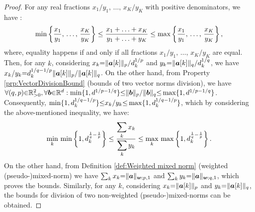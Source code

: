 \begin{proof}
For any real fractions $x_1/y_1,\,\ldots,\,x_K/y_K$ with positive denominators, we have \cite{pahio2005}:
\begin{gather*}
\min\left\lbrace \frac{x_1}{y_1},\,\ldots,\,\frac{x_K}{y_K} \right\rbrace \leq \frac{x_1+\ldots+x_K}{y_1+\ldots+y_K} \leq \max\left\lbrace \frac{x_1}{y_1},\,\ldots,\,\frac{x_K}{y_K} \right\rbrace,
\end{gather*}
where, equality happens if and only if all fractions $x_1/y_1,\,\ldots,\,x_K/y_K$ are equal.
Then, for any $k$, considering $x_k {=} \Vert \boldsymbol{a}[k] \Vert_p / d_k^{1/p}$ and $y_k {=} \Vert \boldsymbol{a}[k] \Vert_q / d_k^{1/q}$, we have $x_k / y_k {=} d_k^{1/q-1/p} \Vert \boldsymbol{a}[k] \Vert_p {/} \Vert \boldsymbol{a}[k] \Vert_q$.
On the other hand, from Property \ref{prp:VectorDivisionBound} (bounds of two vector norms division), we have $\forall (q , p) {\in} \mathbb{R}^2_{{>} 0} , \forall \boldsymbol{b} {\in} \mathbb{R}^d : \min \{1 , d^{1/p - 1/q} \} {\leq} \Vert \boldsymbol{b} \Vert_p / \Vert \boldsymbol{b} \Vert_q {\leq} \max \{1 , d^{1/p - 1/q} \}$. 
Consequently, $\min \{1 , d_k^{1/q - 1/p} \} {\leq} x_k / y_k {\leq} \max \{1 , d_k^{1/q - 1/p} \}$, which by considering the above-mentioned inequality, we have:
\begin{gather*}
\min_k \, \min \left\lbrace 1 , d_k^{\frac1q - \frac1p} \right\rbrace 
\leq \frac{\displaystyle\sum_k x_k}{\displaystyle\sum_k y_k}
\leq \max_k \, \max \left\lbrace 1 , d_k^{\frac1q - \frac1p} \right\rbrace.
\end{gather*}
On the other hand, from Definition \ref{def:Weighted mixed norm} (weighted (pseudo-)mixed-norm) we have $\sum_k x_k {=} \Vert \boldsymbol{a} \Vert_{\boldsymbol{w};p,1}$ and $\sum_k y_k {=} \Vert \boldsymbol{a} \Vert_{\boldsymbol{w};q,1}$, which proves the bounds.
Similarly, for any $k$, considering $x_k {=} \Vert \boldsymbol{a}[k] \Vert_p$ and $y_k {=} \Vert \boldsymbol{a}[k] \Vert_q$, the bounds for division of two non-weighted (pseudo-)mixed-norms can be obtained.
\end{proof}
